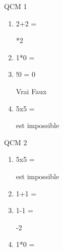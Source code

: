 \documentclass[a4paper, 11pt]{article}
\begin{document}
QCM 1\begin{enumerate}
			\item 2+2 =
			\begin{tabenum} [a)]
				*2
			\end{tabenum}
		\vspace{5mm}

			\item 1*0 =
			\begin{tabenum} [a)]
			\end{tabenum}
		\vspace{5mm}

			\item !0 = 0
			\begin{tabenum} [a)]
				\tabenumitem Vrai
				\tabenumitem Faux
			\end{tabenum}
		\vspace{5mm}

			\item 5x5 =
			\begin{tabenum} [a)]
				\tabenumitem est impossible
			\end{tabenum}
		\vspace{5mm}
\end{enumerate}
	\newpage
QCM 2\begin{enumerate}
			\item 5x5 =
			\begin{tabenum} [a)]
				\tabenumitem est impossible
			\end{tabenum}
		\vspace{5mm}

			\item 1+1 =
			\begin{tabenum} [a)]
			\end{tabenum}
		\vspace{5mm}

			\item 1-1 =
			\begin{tabenum} [a)]
				-2
			\end{tabenum}
		\vspace{5mm}

			\item 1*0 =
			\begin{tabenum} [a)]
			\end{tabenum}
		\vspace{5mm}
\end{enumerate}
\end{document}
